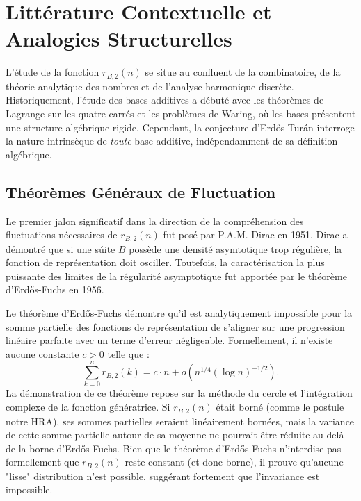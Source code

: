 \documentclass[12pt,a4paper]{article}
\begin{document}
\section{Litt\'erature Contextuelle et Analogies Structurelles}

L'\'etude de la fonction $r_{B,2}(n)$ se situe au confluent de la combinatoire, de la th\'eorie analytique des nombres et de l'analyse harmonique discr\`ete. Historiquement, l'\'etude des bases additives a d\'ebut\'e avec les th\'eor\`emes de Lagrange sur les quatre carr\'es et les probl\`emes de Waring, o\`u les bases pr\'esentent une structure alg\'ebrique rigide. Cependant, la conjecture d'Erd\H{o}s-Tur\'an interroge la nature intrins\`eque de \textit{toute} base additive, ind\'ependamment de sa d\'efinition alg\'ebrique.

\subsection{Th\'eor\`emes G\'en\'eraux de Fluctuation}

Le premier jalon significatif dans la direction de la compr\'ehension des fluctuations n\'ecessaires de $r_{B,2}(n)$ fut pos\'e par P.A.M. Dirac en 1951. Dirac a d\'emontr\'e que si une s\'uite $B$ poss\`ede une densit\'e asymtotique trop r\'eguli\`ere, la fonction de repr\'esentation doit osciller. Toutefois, la caract\'erisation la plus puissante des limites de la r\'egularit\'e asymptotique fut apport\'ee par le th\'eor\`eme d'Erd\H{o}s-Fuchs en 1956.

Le th\'eor\`eme d'Erd\H{o}s-Fuchs d\'emontre qu'il est analytiquement impossible pour la somme partielle des fonctions de repr\'esentation de s'aligner sur une progression lin\'eaire parfaite avec un terme d'erreur n\'egligeable. Formellement, il n'existe aucune constante $c > 0$ telle que :
\begin{equation}
\sum_{k=0}^n r_{B,2}(k) = c \cdot n + o\left(n^{1/4} (\log n)^{-1/2}\right).
\end{equation}
La d\'emonstration de ce th\'eor\`eme repose sur la m\'ethode du cercle et l'int\'egration complexe de la fonction g\'en\'eratrice. Si $r_{B,2}(n)$ \'etait born\'e (comme le postule notre HRA), ses sommes partielles seraient lin\'eairement born\'ees, mais la variance de cette somme partielle autour de sa moyenne ne pourrait \^etre r\'eduite au-del\`a de la borne d'Erd\H{o}s-Fuchs. Bien que le th\'eor\`eme d'Erd\H{o}s-Fuchs n'interdise pas formellement que $r_{B,2}(n)$ reste constant (et donc borne), il prouve qu'aucune "lisse" distribution n'est possible, sugg\'erant fortement que l'invariance est impossible.
\end{document}
